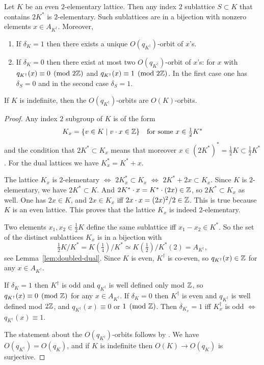 \documentclass{amsart}
\begin{document}
\begin{lemma}
  Let $K$ be an even $2$-elementary lattice. Then any index $2$
  sublattice $S\subset K$ that contains $2K^*$ is $2$-elementary. Such
  sublattices are in a bijection with nonzero elements $x\in
  A_{K^\dag}$. Moreover,
  \begin{enumerate}
  \item If $\delta_K=1$ then there exists a unique
    $O(q_{K^\dag})$-orbit of $x$'s.
  \item If $\delta_K=0$ then there exist at most two
    $O(q_{K^\dag})$-orbit of $x$'s: for $x$ with
    $q_{K^\dag}(x)\equiv 0\pmod{2{\mathbb Z}}$ and
    $q_{K^\dag}(x)\equiv 1\pmod{2{\mathbb Z}}$. In the first case one has
    $\delta_S=0$ and in the second case $\delta_S=1$.
  \end{enumerate}
  If $K$ is indefinite, then the $O(q_{K^\dag})$-orbits are
  $O(K)$-orbits. 
\end{lemma}
\begin{proof}
  Any index $2$ subgroup of $K$ is of the form
  \begin{displaymath}
    K_x = \{ v \in K \mid v \cdot x\in {\mathbb Z} \}
    \quad \text{for some } x\in \tfrac12 K^*
  \end{displaymath}
  and the condition that $2K^*\subset K_x$ means that moreover
  $x\in (2K^*)^* = \frac12 K \subset\frac12 K^*$.
  For the dual lattices we have $K_x^* = K^* + x$.

  The lattice $K_x$ is $2$-elementary $\iff$
  $2K_x^* \subset K_x$ $\iff$ $2K^* + 2x \subset K_x$. Since $K$ is
  $2$-elementary, we have $2K^* \subset K$. And $2K^* \cdot x = K^*
  \cdot (2x) \in{\mathbb Z}$, so $2K^* \subset K_x$ as well.
  One has $2x \in K$, and $2x \in K_x$ iff $2x\cdot x = (2x)^2/2
  \in{\mathbb Z}$. This is true because $K$ is an even lattice. This proves
  that the lattice $K_x$ is indeed $2$-elementary.

  Two elements $x_1,x_2\in\frac12 K$ define the same sublattice iff
  $x_1-x_2\in K^*$. So the set of the distinct sublattices $K_x$ is in
  a bijection with 
  \begin{displaymath}
    \tfrac12 K / K^* = K(\tfrac14) / K^* \simeq K(\tfrac12) / K^*(2)
    = A_{K^\dag},
  \end{displaymath}
  see Lemma~\ref{lem:doubled-dual}. Since $K$ is even, $K^\dag$ is
  co-even, so $q_{K^\dag}(x)\in{\mathbb Z}$ for any $x\in A_{K^\dag}$.

  If $\delta_K=1$ then $K^\dag$ is odd and $q_{K^\dag}$ is well
  defined only mod ${\mathbb Z}$, so $q_{K^\dag}(x)\equiv 0 \pmod{{\mathbb Z}}$ for any $x\in
  A_{K^\dag}$. 
  If $\delta_K=0$ then $K^\dag$ is even and $q_{K^\dag}$ is well
  defined mod ${2{\mathbb Z}}$, and $q_{K^\dag}(x)\equiv 0$ or $1 \pmod{{\mathbb Z}}$. Then
  $\delta_{K_x}=1$ iff $K_x^\dag$ is odd $\iff$ $q_{K^\dag}(x)\equiv 1$.

  The statement about the $O(q_{K^\dag})$-orbits follows by 
  \cite[3.9.1]{nikulin1979integer-symmetric}.
  We have $O(q_{K^\dag}) = O(q_K)$, and if $K$ is indefinite then
  $O(K)\to O(q_K)$ is surjective. 
\end{proof}
\end{document}
